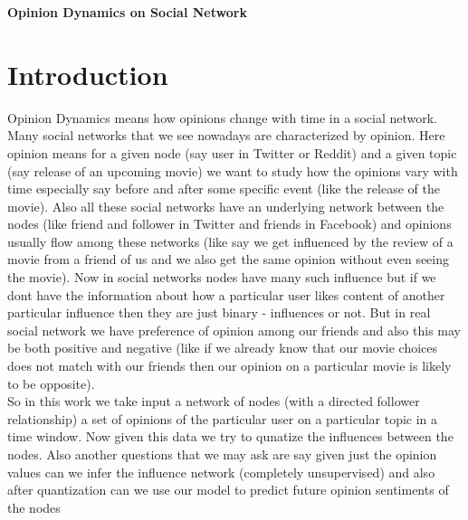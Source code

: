 \clearpage
\begin{center}
\huge{\textbf{Opinion Dynamics on Social Network}} 
\end{center}
\newpage
\newcommand{\twopartdef}[4]
{
	\left\{
		\begin{array}{ll}
			#1 & \mbox{if } #2 \\
			#3 & \mbox{if } #4 
		\end{array}
	\right.
}
\section*{Introduction}
Opinion Dynamics means how opinions change with time in a social network. Many social networks that we see nowadays are characterized by opinion. Here opinion means for a given node (say user in Twitter or Reddit) and a given topic (say release of an upcoming movie) we want to study how the opinions vary with time especially say before and after some specific event (like the release of the movie). Also all these social networks have an underlying network between the nodes (like friend and follower in Twitter and friends in Facebook) and opinions usually flow among these networks (like say we get influenced by the review of a movie from a friend of us and we also get the same opinion without even seeing the movie). Now in social networks nodes have many such influence but if we dont have the information about how a particular user likes content of another particular influence then they are just binary - influences or not. But in real social network we have preference of opinion among our friends and also this may be both positive and negative (like if we already know that our movie choices does not match with our friends then our opinion on a particular movie is likely to be opposite).
\\
So in this work we take input a network of nodes (with a directed follower relationship) a set of opinions of the particular user on a particular topic in a time window. Now given this data we try to qunatize the influences between the nodes. Also another questions that we may ask are say given just the opinion values can we infer the influence network (completely unsupervised) and also after quantization can we use our model to predict future opinion sentiments of the nodes
\\
